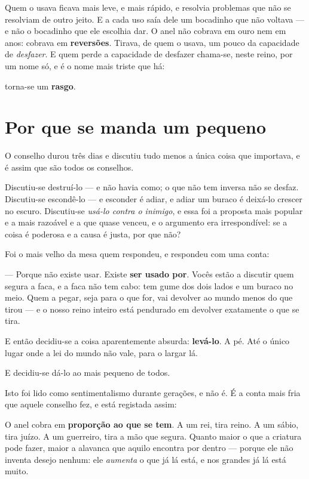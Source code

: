 \documentclass[livro.tex]{subfiles}
\begin{document}
\medskip

Quem o usava ficava mais leve, e mais rápido, e resolvia problemas que não se resolviam de
outro jeito. E a cada uso saía dele um bocadinho que não voltava --- e não o bocadinho que
ele escolhia dar. O anel não cobrava em ouro nem em anos: cobrava em \textbf{reversões}.
Tirava, de quem o usava, um pouco da capacidade de \emph{desfazer}. E quem perde a
capacidade de desfazer chama-se, neste reino, por um nome só, e é o nome mais triste que
há:

torna-se um \textbf{rasgo}.

\chapter{Por que se manda um pequeno}

O conselho durou três dias e discutiu tudo menos a única coisa que importava, e é assim
que são todos os conselhos.

Discutiu-se destruí-lo --- e não havia como; o que não tem inversa não se desfaz.
Discutiu-se escondê-lo --- e esconder é adiar, e adiar um buraco é deixá-lo crescer no
escuro. Discutiu-se \emph{usá-lo contra o inimigo}, e essa foi a proposta mais popular e a
mais razoável e a que quase venceu, e o argumento era irrespondível: se a coisa é
poderosa e a causa é justa, por que não?

Foi o mais velho da mesa quem respondeu, e respondeu com uma conta:

--- Porque não existe usar. Existe \textbf{ser usado por}. Vocês estão a discutir quem
segura a faca, e a faca não tem cabo: tem gume dos dois lados e um buraco no meio. Quem a
pegar, seja para o que for, vai devolver ao mundo menos do que tirou --- e o nosso reino
inteiro está pendurado em devolver exatamente o que se tira.

\medskip

E então decidiu-se a coisa aparentemente absurda: \textbf{levá-lo}. A pé. Até o único
lugar onde a lei do mundo não vale, para o largar lá.

E decidiu-se dá-lo ao mais pequeno de todos.

\medskip

Isto foi lido como sentimentalismo durante gerações, e não é. É a conta mais fria que
aquele conselho fez, e está registada assim:

O anel cobra em \textbf{proporção ao que se tem}. A um rei, tira reino. A um sábio, tira
juízo. A um guerreiro, tira a mão que segura. Quanto maior o que a criatura pode fazer,
maior a alavanca que aquilo encontra por dentro --- porque ele não inventa desejo nenhum:
ele \emph{aumenta} o que já lá está, e nos grandes já lá está muito.
\end{document}
